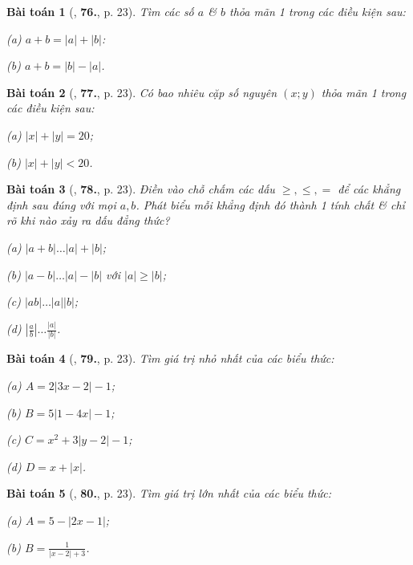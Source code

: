 \documentclass{article}
\numberwithin{equation}{section}
\newtheorem{baitoan}{Bài toán}
\begin{document}
\begin{baitoan}[\cite{Binh_Toan_7_tap_1}, \textbf{76.}, p. 23]
	Tìm các số $a$ \& $b$ thỏa mãn 1 trong các điều kiện sau:
	\begin{enumerate*}
		\item[(a)] $a + b = |a| + |b|$:
		\item[(b)] $a + b = |b| - |a|$.
	\end{enumerate*}
\end{baitoan}

\begin{baitoan}[\cite{Binh_Toan_7_tap_1}, \textbf{77.}, p. 23]
	Có bao nhiêu cặp số nguyên $(x;y)$ thỏa mãn 1 trong các điều kiện sau:
	\begin{enumerate*}
		\item[(a)] $|x| + |y| = 20$;
		\item[(b)] $|x| + |y| < 20$.
	\end{enumerate*}
\end{baitoan}

\begin{baitoan}[\cite{Binh_Toan_7_tap_1}, \textbf{78.}, p. 23]
	Điền vào chỗ chấm các dấu $\ge,\le,=$ để các khẳng định sau đúng với mọi $a,b$. Phát biểu mỗi khẳng định đó thành 1 tính chất \& chỉ rõ khi nào xảy ra dấu đẳng thức?
	\begin{enumerate*}
		\item[(a)] $|a + b|\ldots|a| + |b|$;
		\item[(b)] $|a - b|\ldots|a| - |b|$ với $|a|\ge|b|$;
		\item[(c)] $|ab|\ldots|a||b|$;
		\item[(d)] $\left|\frac{a}{b}\right|\ldots\frac{|a|}{|b|}$.
	\end{enumerate*}
\end{baitoan}

\begin{baitoan}[\cite{Binh_Toan_7_tap_1}, \textbf{79.}, p. 23]
	Tìm giá trị nhỏ nhất của các biểu thức:
	\begin{enumerate*}
		\item[(a)] $A = 2|3x - 2| - 1$;
		\item[(b)] $B = 5|1 - 4x| - 1$;
		\item[(c)] $C = x^2 + 3|y - 2| - 1$;
		\item[(d)] $D = x + |x|$.
	\end{enumerate*}
\end{baitoan}

\begin{baitoan}[\cite{Binh_Toan_7_tap_1}, \textbf{80.}, p. 23]
	Tìm giá trị lớn nhất của các biểu thức:
	\begin{enumerate*}
		\item[(a)] $A = 5 - |2x - 1|$;
		\item[(b)] $B = \frac{1}{|x - 2| + 3}$.
	\end{enumerate*}
\end{baitoan}
\end{document}
